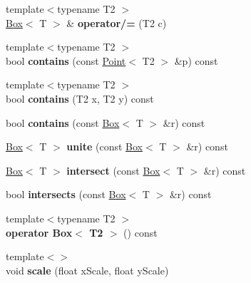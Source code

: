 \begin{DoxyCompactItemize}
\item 
\hypertarget{class_box_a51aa00812060d1e4665b4a0be9935cb8}{
{\footnotesize template$<$typename T2 $>$ }\\\hyperlink{class_box}{Box}$<$ T $>$ \& {\bfseries operator/=} (T2 c)}
\label{class_box_a51aa00812060d1e4665b4a0be9935cb8}

\item 
\hypertarget{class_box_a349c282feb79bd25acd2e019e324cb29}{
{\footnotesize template$<$typename T2 $>$ }\\bool {\bfseries contains} (const \hyperlink{class_point}{Point}$<$ T2 $>$ \&p) const }
\label{class_box_a349c282feb79bd25acd2e019e324cb29}

\item 
\hypertarget{class_box_ac9591ddb1c83a71913baaa7339b6b320}{
{\footnotesize template$<$typename T2 $>$ }\\bool {\bfseries contains} (T2 x, T2 y) const }
\label{class_box_ac9591ddb1c83a71913baaa7339b6b320}

\item 
\hypertarget{class_box_add30ee8481bd46e34b4f3a63a126712a}{
bool {\bfseries contains} (const \hyperlink{class_box}{Box}$<$ T $>$ \&r) const }
\label{class_box_add30ee8481bd46e34b4f3a63a126712a}

\item 
\hypertarget{class_box_aeed25d0e0ffb49e8e77ca3bd36509017}{
\hyperlink{class_box}{Box}$<$ T $>$ {\bfseries unite} (const \hyperlink{class_box}{Box}$<$ T $>$ \&r) const }
\label{class_box_aeed25d0e0ffb49e8e77ca3bd36509017}

\item 
\hypertarget{class_box_a88cd9779de891c4c86f5a6ebc53f6e16}{
\hyperlink{class_box}{Box}$<$ T $>$ {\bfseries intersect} (const \hyperlink{class_box}{Box}$<$ T $>$ \&r) const }
\label{class_box_a88cd9779de891c4c86f5a6ebc53f6e16}

\item 
\hypertarget{class_box_aac069f504fa8b0efde1817ec25bf72ca}{
bool {\bfseries intersects} (const \hyperlink{class_box}{Box}$<$ T $>$ \&r) const }
\label{class_box_aac069f504fa8b0efde1817ec25bf72ca}

\item 
\hypertarget{class_box_a59ff93ffee6386885d5eb5cb13610b95}{
{\footnotesize template$<$typename T2 $>$ }\\{\bfseries operator Box$<$ T2 $>$} () const }
\label{class_box_a59ff93ffee6386885d5eb5cb13610b95}

\item 
\hypertarget{class_box_a3e569579282f21474f44a67eb3a27128}{
{\footnotesize template$<$$>$ }\\void {\bfseries scale} (float xScale, float yScale)}
\label{class_box_a3e569579282f21474f44a67eb3a27128}


\end{DoxyCompactItemize}
